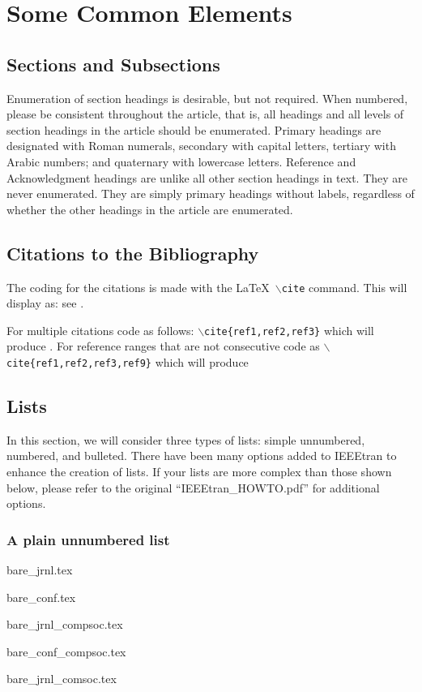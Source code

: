 \section{Some Common Elements}
\subsection{Sections and Subsections}
Enumeration of section headings is desirable, but not required. When numbered, please be consistent throughout the article, that is, all headings and all levels of section headings in the article should be enumerated. Primary headings are designated with Roman numerals, secondary with capital letters, tertiary with Arabic numbers; and quaternary with lowercase letters. Reference and Acknowledgment headings are unlike all other section headings in text. They are never enumerated. They are simply primary headings without labels, regardless of whether the other headings in the article are enumerated. 

\subsection{Citations to the Bibliography}
The coding for the citations is made with the \LaTeX\ $\backslash${\tt{cite}} command. 
This will display as: see \cite{ref1}.

For multiple citations code as follows: {\tt{$\backslash$cite\{ref1,ref2,ref3\}}}
 which will produce \cite{ref1,ref2,ref3}. For reference ranges that are not consecutive code as {\tt{$\backslash$cite\{ref1,ref2,ref3,ref9\}}} which will produce  \cite{ref1,ref2,ref3,ref9}

\subsection{Lists}
In this section, we will consider three types of lists: simple unnumbered, numbered, and bulleted. There have been many options added to IEEEtran to enhance the creation of lists. If your lists are more complex than those shown below, please refer to the original ``IEEEtran\_HOWTO.pdf'' for additional options.\\

\subsubsection*{\bf A plain  unnumbered list}
\begin{list}{}{}
\item{bare\_jrnl.tex}
\item{bare\_conf.tex}
\item{bare\_jrnl\_compsoc.tex}
\item{bare\_conf\_compsoc.tex}
\item{bare\_jrnl\_comsoc.tex}
\end{list}

